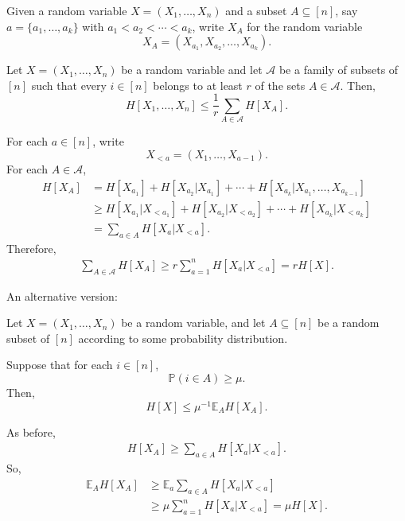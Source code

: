 \documentclass[12pt]{article}
\begin{document}
Given a random variable $X = (X_1, \ldots, X_n)$ and a subset $A \subseteq [n]$, say $a = \{a_1, \ldots, a_k\}$ with $a_1 < a_2 < \cdots < a_k$, write $X_A$ for the random variable
\[
X_A = (X_{a_1}, X_{a_2}, \ldots, X_{a_k}).
\]
\begin{lemma}[Shearer]
	Let $X = (X_1, \ldots, X_n)$ be a random variable and let $\mathcal{A}$ be a family of subsets of $[n]$ such that every $i \in [n]$ belongs to at least $r$ of the sets $A \in \mathcal{A}$. Then,
	\[
		H[X_1, \ldots, X_n] \leq \frac1r \sum_{A \in \mathcal{A}} H[X_A].
	\]
\end{lemma}

\begin{proofbox}
	For each $a \in [n]$, write
	\[
	X_{<a} = (X_1, \ldots, X_{a-1}).
	\]
	For each $A \in \mathcal{A}$,
	\begin{align*}
		H[X_{A}] &= H[X_{a_1}] + H[X_{a_2} | X_{a_1}] + \cdots + H[X_{a_k}|X_{a_1},\ldots,X_{a_{k-1}}] \\
			 &\geq H[X_{a_1} | X_{<a_1}] + H[X_{a_2}|X_{<a_2}] + \cdots + H[X_{a_k}|X_{<a_k}] \\
			 &= \sum_{a \in A} H[X_{a}|X_{<a}].
	\end{align*}
	Therefore,
	\begin{align*}
		\sum_{A \in \mathcal{A}} H[X_A] \geq r \sum_{a = 1}^n H[X_a | X_{<a}] = r H[X].
	\end{align*}
\end{proofbox}


An alternative version:
\begin{lemma}
	Let $X = (X_1, \ldots, X_n)$ be a random variable, and let $A \subseteq [n]$ be a random subset of $[n]$ according to some probability distribution.

	Suppose that for each $i \in [n]$,
	\[
	\mathbb{P}(i \in A) \geq \mu.
	\]
	Then,
	\[
		H[X] \leq \mu^{-1} \mathbb{E}_A H[X_A].
	\]
\end{lemma}

\begin{proofbox}
	As before,
	\begin{align*}
		H[X_A] \geq \sum_{a \in A} H[X_a | X_{<a}].
	\end{align*}
	So,
	\begin{align*}
		\mathbb{E}_A H[X_A] &\geq \mathbb{E}_a \sum_{a \in A} H[X_a | X_{<a}] \\
				    &\geq \mu \sum_{a = 1}^{n} H[X_a|X_{<a}] = \mu H[X].
	\end{align*}
\end{proofbox}
\end{document}
